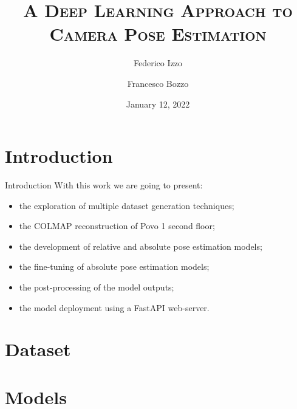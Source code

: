\documentclass[
    center,
]{beamer}
\title[Deep Learning Camera Pose Estimation]{\textsc{A Deep Learning Approach to\\Camera Pose Estimation}}
\author[Bozzo - Izzo]{Federico Izzo \and Francesco Bozzo}
\institute[UniTN]{University of Trento}
\date{January 12, 2022}
\begin{document}
\begin{frame}
    \titlepage
\end{frame}



\section{Introduction}
\begin{frame}{Introduction}
    With this work we are going to present:
    \begin{itemize}
        \item the exploration of multiple dataset generation techniques;
        \item the COLMAP reconstruction of Povo 1 second floor;
        \item the development of relative and absolute pose estimation models;
        \item the fine-tuning of absolute pose estimation models;
        \item the post-processing of the model outputs;
        \item the model deployment using a FastAPI web-server. 
    \end{itemize}
\end{frame}

\section{Dataset}

\section{Models}
\end{document}
